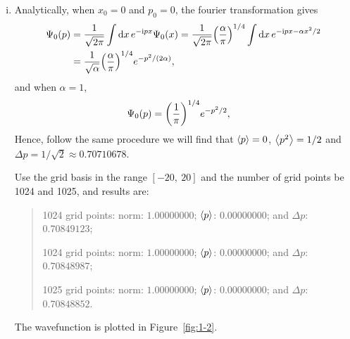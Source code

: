 \documentclass{article}
\newcommand{\iu}{\ensuremath{\mathrm{i}}}
\begin{document}
\begin{enumerate}[1.]
\begin{enumerate}[(i)]
    \item Analytically, when $x_0 = 0$ and $p_0 = 0$, the fourier transformation gives
    \begin{align*}
      \Psi_0(p) &= \frac{1}{\sqrt{2 \pi }} \int \dd{x} e^{-\iu px} \Psi_0(x)
      =\frac{1}{\sqrt{2 \pi }} \qty(\frac{\alpha}{\pi})^{1/4}  \int \dd{x} e^{-\iu px -\alpha x^2/2}\\
      &= \frac{1}{\sqrt{\alpha}} \qty(\frac{\alpha}{\pi})^{1/4}  e^{-{p^2}/(2\alpha)},
    \end{align*}
    and when $\alpha = 1$, 
    \begin{align*}
      \Psi_0(p)
      &=  \qty(\frac{1}{\pi})^{1/4}  e^{-{p^2}/{2}},
    \end{align*}
    Hence, follow the same procedure we will find that $\ev{p} = 0$, $\ev{p^2} = 1/2$ and $\Delta{p} = 1/\sqrt{2} \approx 0.70710678$.
  
    Use the grid basis in the range $[-20,\ 20]$ and the number of grid points be 1024 and 1025, and results are:
    \begin{quotation}
      1024 grid points: norm: $1.00000000$; $\ev{p}$: $0.00000000$; and $\Delta p$: $0.70849123$;

      1024 grid points: norm: $1.00000000$; $\ev{p}$: $0.00000000$; and $\Delta p$: $0.70848987$;

      1025 grid points: norm: $1.00000000$; $\ev{p}$: $0.00000000$; and $\Delta p$: $0.70848852$.
    \end{quotation}
    The wavefunction is plotted in Figure~\ref{fig:1-2}.


\end{enumerate}
\end{enumerate}
\end{document}
